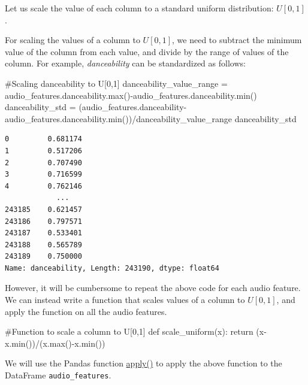 \documentclass[
  letterpaper,
  DIV=11,
  numbers=noendperiod]{scrreprt}
\newenvironment{Shaded}{\begin{snugshade}}{\end{snugshade}}
\newcommand{\BuiltInTok}[1]{\textcolor[rgb]{0.00,0.23,0.31}{#1}}
\newcommand{\CommentTok}[1]{\textcolor[rgb]{0.37,0.37,0.37}{#1}}
\newcommand{\ControlFlowTok}[1]{\textcolor[rgb]{0.00,0.23,0.31}{#1}}
\newcommand{\KeywordTok}[1]{\textcolor[rgb]{0.00,0.23,0.31}{#1}}
\newcommand{\NormalTok}[1]{\textcolor[rgb]{0.00,0.23,0.31}{#1}}
\newcommand{\OperatorTok}[1]{\textcolor[rgb]{0.37,0.37,0.37}{#1}}
\begin{document}
Let us scale the value of each column to a standard uniform
distribution: \(U[0,1]\).

For scaling the values of a column to \(U[0,1]\), we need to subtract
the minimum value of the column from each value, and divide by the range
of values of the column. For example, \emph{danceability} can be
standardized as follows:

\begin{Shaded}
\begin{Highlighting}[]
\CommentTok{\#Scaling danceability to U[0,1]}
\NormalTok{danceability\_value\_range }\OperatorTok{=}\NormalTok{ audio\_features.danceability.}\BuiltInTok{max}\NormalTok{()}\OperatorTok{{-}}\NormalTok{audio\_features.danceability.}\BuiltInTok{min}\NormalTok{()}
\NormalTok{danceability\_std }\OperatorTok{=}\NormalTok{ (audio\_features.danceability}\OperatorTok{{-}}\NormalTok{audio\_features.danceability.}\BuiltInTok{min}\NormalTok{())}\OperatorTok{/}\NormalTok{danceability\_value\_range}
\NormalTok{danceability\_std}
\end{Highlighting}
\end{Shaded}

\begin{verbatim}
0         0.681174
1         0.517206
2         0.707490
3         0.716599
4         0.762146
            ...   
243185    0.621457
243186    0.797571
243187    0.533401
243188    0.565789
243189    0.750000
Name: danceability, Length: 243190, dtype: float64
\end{verbatim}

However, it will be cumbersome to repeat the above code for each audio
feature. We can instead write a function that scales values of a column
to \(U[0,1]\), and apply the function on all the audio features.

\begin{Shaded}
\begin{Highlighting}[]
\CommentTok{\#Function to scale a column to U[0,1]}
\KeywordTok{def}\NormalTok{ scale\_uniform(x):}
    \ControlFlowTok{return}\NormalTok{ (x}\OperatorTok{{-}}\NormalTok{x.}\BuiltInTok{min}\NormalTok{())}\OperatorTok{/}\NormalTok{(x.}\BuiltInTok{max}\NormalTok{()}\OperatorTok{{-}}\NormalTok{x.}\BuiltInTok{min}\NormalTok{())}
\end{Highlighting}
\end{Shaded}

We will use the Pandas function
\href{https://pandas.pydata.org/docs/reference/api/pandas.DataFrame.apply.html}{apply()}
to apply the above function to the DataFrame \texttt{audio\_features}.
\end{document}
